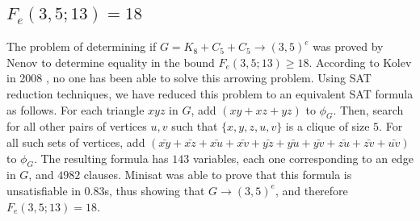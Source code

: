 \documentclass[paper=a4, fontsize=11pt]{scrartcl} %
\begin{document}
\subsection{$F_e(3,5;13) = 18$}
The problem of determining if $G = K_8 + C_5 + C_5 \to (3,5)^e$ was proved by Nenov \cite{Nenov83-1}
to determine equality in the bound $F_e(3,5;13) \geq 18$. According to Kolev in 2008 \cite{Kolev08-2},
no one has been able to solve this arrowing problem. Using SAT reduction techniques, we have 
reduced this problem to an equivalent SAT formula as follows. For each triangle $xyz$ in $G$, add
$(xy + xz + yz)$ to $\phi_G$. Then, search for all other pairs of vertices $u,v$ such that $\{x,y,z,u,v\}$ is a clique
of size $5$. For all such sets of vertices, add $(\bar{xy} + \bar{xz} + \bar{xu} + \bar{xv} + \bar{yz} + \bar{yu} + \bar{yv} + \bar{zu} + \bar{zv} + \bar{uv})$
to $\phi_G$. The resulting formula has $143$ variables, each one corresponding to an edge in $G$,
and $4982$ clauses. Minisat was able to prove that this formula is unsatisfiable in 0.83s, thus
showing that $G \to (3,5)^e$, and therefore $F_e(3,5;13) = 18$.

\end{document}
